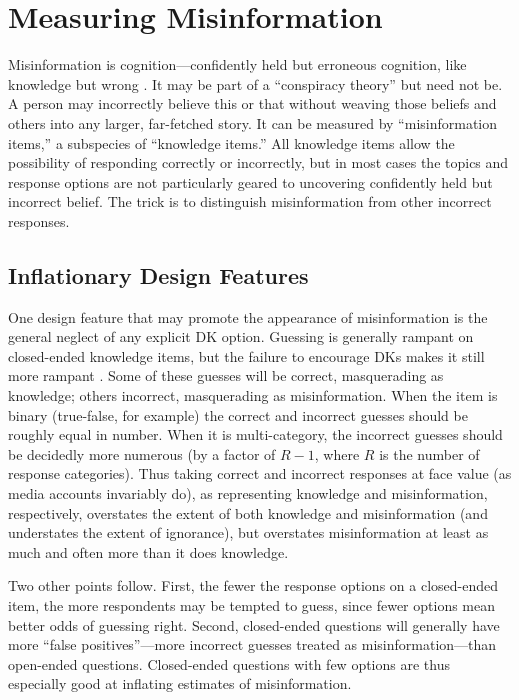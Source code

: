 \documentclass[11pt]{article}
\begin{document}
\section{Measuring Misinformation}

Misinformation is cognition---confidently held but erroneous cognition, like knowledge but wrong \citep{luskin2026, pasek2015}. It may be part of a ``conspiracy theory'' but need not be. A person may incorrectly believe this or that without weaving those beliefs and others into any larger, far-fetched story. It can be measured by ``misinformation items,'' a subspecies of ``knowledge items.'' All knowledge items allow the possibility of responding correctly or incorrectly, but in most cases the topics and response options are not particularly geared to uncovering confidently held but incorrect belief. The trick is to distinguish misinformation from other incorrect responses.

\subsection{Inflationary Design Features}

One design feature that may promote the appearance of misinformation is the general neglect of any explicit DK option. Guessing is generally rampant on closed-ended knowledge items, but the failure to encourage DKs makes it still more rampant \citep{luskin2011}. Some of these guesses will be correct, masquerading as knowledge; others incorrect, masquerading as misinformation. When the item is binary (true-false, for example) the correct and incorrect guesses should be roughly equal in number. When it is multi-category, the incorrect guesses should be decidedly more numerous (by a factor of $R - 1$, where $R$ is the number of response categories). Thus taking correct and incorrect responses at face value (as media accounts invariably do), as representing knowledge and misinformation, respectively, overstates the extent of both knowledge and misinformation (and understates the extent of ignorance), but overstates misinformation at least as much and often more than it does knowledge.

Two other points follow. First, the fewer the response options on a closed-ended item, the more respondents may be tempted to guess, since fewer options mean better odds of guessing right. Second, closed-ended questions will generally have more ``false positives''---more incorrect guesses treated as misinformation---than open-ended questions. Closed-ended questions with few options are thus especially good at inflating estimates of misinformation.
\end{document}
